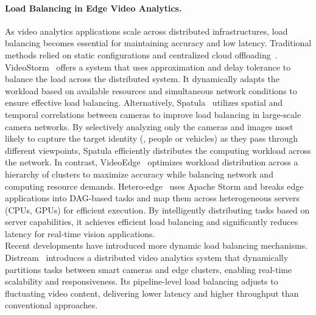 \paragraph{Load Balancing in Edge Video Analytics.}
As video analytics applications scale across distributed infrastructures, load balancing becomes essential for maintaining accuracy and low latency.
Traditional methods relied on static configurations and centralized cloud offloading~\cite{jain2020spatula,201465videostorm,zhang2019hetero,hung2018videoedge}. VideoStorm~\cite{201465videostorm} offers a system that uses approximation and delay tolerance to balance the load across the distributed system. It dynamically adapts the workload based on available resources and simultaneous network conditions to ensure effective load balancing. Alternatively, Spatula~\cite{jain2020spatula} utilizes spatial and temporal correlations between cameras to improve load balancing in large-scale camera networks. By selectively analyzing only the cameras and images most likely to capture the target identity (\eg, people or vehicles) as they pass through different viewpoints, Spatula efficiently distributes the computing workload across the network. In contrast, VideoEdge~\cite{hung2018videoedge} optimizes workload distribution across a hierarchy of clusters to maximize accuracy while balancing network and computing resource demands.
Hetero-edge~\cite{zhang2019hetero} uses Apache Storm and breaks edge applications into DAG-based tasks and map them across heterogeneous servers (CPUs, GPUs) for efficient execution. By intelligently distributing tasks based on server capabilities, it achieves efficient load balancing and significantly reduces latency for real-time vision applications.\\
Recent developments have introduced more dynamic load balancing mechanisms. Distream~\cite{zeng2020distream} introduces a distributed video analytics system that dynamically partitions tasks between smart cameras and edge clusters, enabling real-time scalability and responsiveness. Its pipeline-level load balancing adjusts to fluctuating video content, delivering lower latency and higher throughput than conventional approaches.

